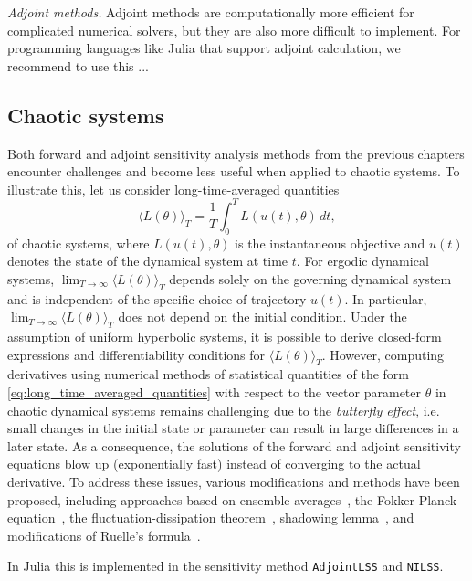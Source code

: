 \vspace{5px}
\noindent\textit{Adjoint methods. }
Adjoint methods are computationally more efficient for complicated numerical solvers, but they are also more difficult to implement.
For programming languages like Julia that support adjoint calculation, we recommend to use this ... 








\subsection{Chaotic systems}

Both forward and adjoint sensitivity analysis methods from the previous chapters encounter challenges and become less useful when applied to chaotic systems.
To illustrate this, let us consider long-time-averaged quantities 
\begin{equation}\label{eq:long_time_averaged_quantities}
    \langle L(\theta) \rangle_T = \frac{1}{T} \int_0^T L(u(t), \theta) \, dt, 
\end{equation}
of chaotic systems, where $L(u(t), \theta)$ is the instantaneous objective and $u(t)$ denotes the state of the dynamical system at time $t$.
For ergodic dynamical systems, $\lim_{T\to\infty} \langle L(\theta) \rangle_T$ depends solely on the governing dynamical system and is independent of the specific choice of trajectory $u(t)$. 
In particular, $\lim_{T\to\infty} \langle L(\theta) \rangle_T$ does not depend on the initial condition. 
Under the assumption of uniform hyperbolic systems, it is possible to derive closed-form expressions and differentiability conditions for $ \langle L(\theta) \rangle_T$\cite{ruelle1997differentiation,ruelle2009review}. 
However, computing derivatives using numerical methods of statistical quantities of the form \eqref{eq:long_time_averaged_quantities} with respect to the vector parameter $\theta$ in chaotic dynamical systems remains challenging due to the \textit{butterfly effect}, i.e. small changes in the initial state or parameter can result in large differences in a later state. 
As a consequence, the solutions of the forward and adjoint sensitivity equations blow up (exponentially fast) instead of converging to the actual derivative.
To address these issues, various modifications and methods have been proposed, including approaches based on ensemble averages~\cite{lea2000sensitivity, eyink2004ruelle}, the Fokker-Planck equation~\cite{thuburn2005climate, blonigan2014probability}, the fluctuation-dissipation theorem~\cite{leith1975climate, abramov2007blended, abramov2008new}, shadowing lemma~\cite{wang2013forward, wang2014least, wang2014convergence, ni2017sensitivity, blonigan2017adjoint, blonigan2018multiple, ni2019adjoint, ni2019sensitivity}, and modifications of Ruelle's formula~\cite{chandramoorthy2022efficient, ni2020fast}.

In Julia this is implemented in the sensitivity method \texttt{AdjointLSS} and \texttt{NILSS}.